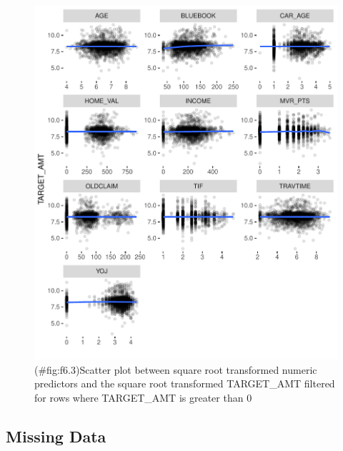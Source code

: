 \documentclass[]{article}
\begin{document}
\begin{figure}
\centering
\includegraphics{proj4_files/figure-latex/f6.3-1.pdf}
\caption{(\#fig:f6.3)Scatter plot between square root transformed
numeric predictors and the square root transformed TARGET\_AMT filtered
for rows where TARGET\_AMT is greater than 0}
\end{figure}

\subsection{Missing Data}\label{missing-data}
\end{document}
